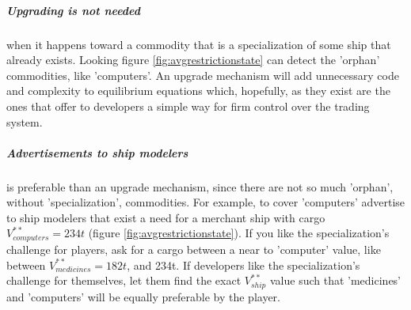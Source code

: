 \documentclass[]{article}
\begin{document}
 \subparagraph{Upgrading is not needed} when it happens toward a commodity that is a specialization of some ship that already exists. Looking figure \ref{fig:avgrestrictionstate} can detect the 'orphan' commodities, like 'computers'. An upgrade mechanism will add unnecessary code and complexity to equilibrium equations which, hopefully, as they exist are the ones that offer to developers a simple way for firm control over the trading system.
 \subparagraph{Advertisements to ship modelers} is preferable than an upgrade mechanism, since there are not so much 'orphan', without 'specialization', commodities. For example, to cover 'computers' advertise to ship modelers that exist a need for a merchant ship with cargo $V^{**}_{computers}=234t$ (figure \ref{fig:avgrestrictionstate}). If you like the specialization's challenge for players, ask for a cargo between a near to 'computer' value, like between $V^{**}_{medicines}=182t$, and 234t. If developers like the specialization's challenge for themselves, let them find the exact $V^{**}_{ship}$ value such that 'medicines' and 'computers' will be equally preferable by the player.
\end{document}
